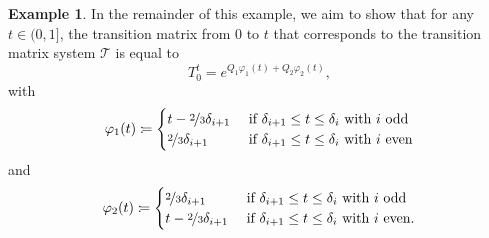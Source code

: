 \documentclass[10pt,a4paper]{paper}
\theoremstyle{definition}
\newtheorem{exmp}{Example}%
\newcommand{\coloneqq}{:\!=}
\begin{document}
\begin{exmp}
In the remainder of this example, we aim to show that for any $t\in(0,1]$, the transition matrix from $0$ to $t$ that corresponds to the transition matrix system $\mathcal{T}$ is equal to
\vspace{4pt}
\begin{equation}\label{eq:ex4:def}
T_0^t=e^{Q_1\varphi_1(t)+Q_2\varphi_2(t)},
\end{equation}
with
\begin{equation}\label{eq:ex4:phi1}
\varphi_1(t)
\coloneqq
\begin{cases}
t-\nicefrac{2}{3}\delta_{i+1}
&\text{ if $\delta_{i+1}\leq t\leq\delta_{i}$ with $i$ odd}\\
\nicefrac{2}{3}\delta_{i+1}
&\text{ if $\delta_{i+1}\leq t\leq\delta_{i}$ with $i$ even} 
\end{cases}
\end{equation}
and
\begin{equation}\label{eq:ex4:phi2}
\varphi_2(t)
\coloneqq
\begin{cases}
\nicefrac{2}{3}\delta_{i+1}
&\text{ if $\delta_{i+1}\leq t\leq\delta_{i}$ with $i$ odd}\\
t-\nicefrac{2}{3}\delta_{i+1}
&\text{ if $\delta_{i+1}\leq t\leq\delta_{i}$ with $i$ even.} 
\end{cases}
\vspace{7pt}
\end{equation}


\end{exmp}
\end{document}
